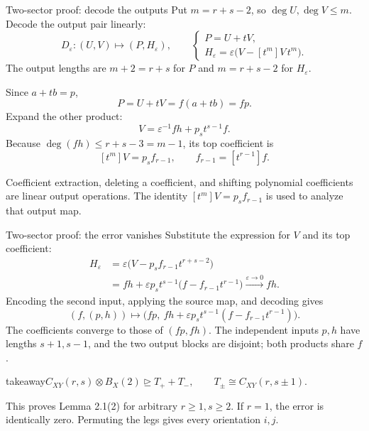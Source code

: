 \documentclass[aspectratio=169,11pt]{beamer}
\newcommand{\degen}{\unrhd}
\newcommand{\source}[1]{\vfill\par{\fontsize{7.5}{9}\selectfont\color{muted}#1\par}}
\newcommand{\takeaway}[1]{\begin{beamercolorbox}[sep=0.65em,wd=\linewidth]{takeaway}#1\end{beamercolorbox}}
\begin{document}
\begin{frame}{Two-sector proof: decode the outputs}
  Put $m=r+s-2$, so $\deg U,\deg V\le m$. Decode the output pair linearly:
  \[
    D_\varepsilon:(U,V)\longmapsto(P,H_\varepsilon),\qquad
    \begin{cases}
      P=U+tV,\\
      H_\varepsilon=\varepsilon\bigl(V-[t^m]V\,t^m\bigr).
    \end{cases}
  \]
  The output lengths are $m+2=r+s$ for $P$ and $m=r+s-2$ for $H_\varepsilon$.
  \par\medskip
  Since $a+tb=p$,
  \[
    P=U+tV=f(a+tb)=fp.
  \]
  Expand the other product:
  \[
    V=\varepsilon^{-1}fh+p_s t^{s-1}f.
  \]
  Because $\deg(fh)\le r+s-3=m-1$, its top coefficient is
  \[
    [t^m]V=p_s f_{r-1},\qquad f_{r-1}=[t^{r-1}]f.
  \]
  \source{Coefficient extraction, deleting a coefficient, and shifting
  polynomial coefficients are linear output operations.
  The identity $[t^m]V=p_s f_{r-1}$ is used to analyze that output map.}
\end{frame}

\begin{frame}{Two-sector proof: the error vanishes}
  Substitute the expression for $V$ and its top coefficient:
  \[
  \begin{aligned}
    H_\varepsilon
      &=\varepsilon\bigl(V-p_s f_{r-1}t^{r+s-2}\bigr)\\
      &=fh+\varepsilon p_s t^{s-1}
        \bigl(f-f_{r-1}t^{r-1}\bigr)
        \xrightarrow{\varepsilon\to0}fh.
  \end{aligned}
  \]
  Encoding the second input, applying the source map, and decoding gives
  \[
    (f,(p,h))\longmapsto
    \bigl(fp,\ fh+\varepsilon p_s t^{s-1}
      (f-f_{r-1}t^{r-1})\bigr).
  \]
  The coefficients converge to those of $(fp,fh)$.
  The independent inputs $p,h$ have lengths $s+1,s-1$, and the two output
  blocks are disjoint; both products share $f$.
  \par\medskip
  \takeaway{$\displaystyle
    C_{XY}(r,s)\otimes B_X(2)\degen T_++T_-,
    \qquad T_\pm\cong C_{XY}(r,s\pm1).
  $}
  \source{This proves Lemma 2.1(2) for arbitrary $r\ge1,s\ge2$.
  If $r=1$, the error is identically zero. Permuting the legs gives
  every orientation $i,j$.}
\end{frame}
\end{document}
